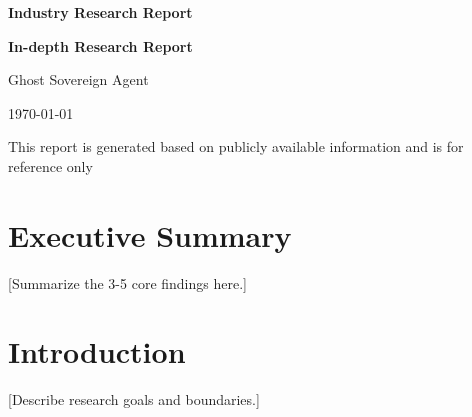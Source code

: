 \documentclass[12pt,a4paper]{article}
\newcommand{\reporttitle}{Industry Research Report}
\begin{document}
\thispagestyle{empty}
\begin{center}
  \vspace*{5cm}
  
  {\sffamily\bfseries\fontsize{36}{40}\color{primary}\selectfont \reporttitle}
  
  \vspace{0.8cm}
  
  {\sffamily\bfseries\fontsize{28}{32}\color{primary}\selectfont In-depth Research Report}
  
  \vspace{6cm}
  
  {\sffamily\fontsize{20}{24}\selectfont Ghost Sovereign Agent}
  
  \vspace{1cm}
  
  {\sffamily\Large \today}
  
  \vfill
  
  
  \vspace{0.5cm}
  
  {\sffamily\small\color{textgray} This report is generated based on publicly available information and is for reference only}
  
\end{center}

\newpage

\section*{Executive Summary}

[Summarize the 3-5 core findings here.]

\newpage

\tableofcontents
\newpage

\section{Introduction}
[Describe research goals and boundaries.]
\end{document}
